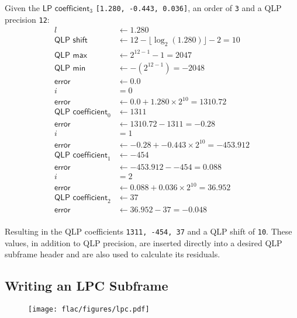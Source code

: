 Given the $\textsf{LP coefficient}_3$ \texttt{[1.280, -0.443, 0.036]},
an \textsf{order} of \texttt{3} and a \textsf{QLP precision} \texttt{12}:
\begin{align*}
l &\leftarrow 1.280 \\
\textsf{QLP shift} &\leftarrow 12 - \lfloor \log_2(1.280) \rfloor - 2 = 10 \\
\textsf{QLP max} &\leftarrow 2 ^ {12 - 1} - 1 = 2047 \\
\textsf{QLP min} &\leftarrow -(2 ^ {12 - 1}) = -2048 \\
\textsf{error} &\leftarrow 0.0 \\
i &= 0 \\
\textsf{error} &\leftarrow 0.0 + 1.280 \times 2 ^ {10} = 1310.72 \\
\textsf{QLP coefficient}_0 &\leftarrow 1311 \\
\textsf{error} &\leftarrow 1310.72 - 1311 = -0.28 \\
i &= 1 \\
\textsf{error} &\leftarrow -0.28 + -0.443 \times 2 ^ {10} = -453.912 \\
\textsf{QLP coefficient}_1 &\leftarrow -454 \\
\textsf{error} &\leftarrow -453.912 - -454 = 0.088 \\
i &= 2 \\
\textsf{error} &\leftarrow 0.088 + 0.036 \times 2 ^ {10} = 36.952 \\
\textsf{QLP coefficient}_2 &\leftarrow 37 \\
\textsf{error} &\leftarrow 36.952 - 37 = -0.048 \\
\end{align*}
\par
\noindent
Resulting in the QLP coefficients \texttt{1311, -454, 37}
and a QLP shift of \texttt{10}.
These values, in addition to QLP precision,
are inserted directly into a desired QLP subframe header
and are also used to calculate its residuals.

\clearpage

\subsection{Writing an LPC Subframe}
\label{flac:write_lpc_subframe}
{
  
}
\begin{figure}[h]
\texttt{[image: flac/figures/lpc.pdf]}
\end{figure}

\clearpage

